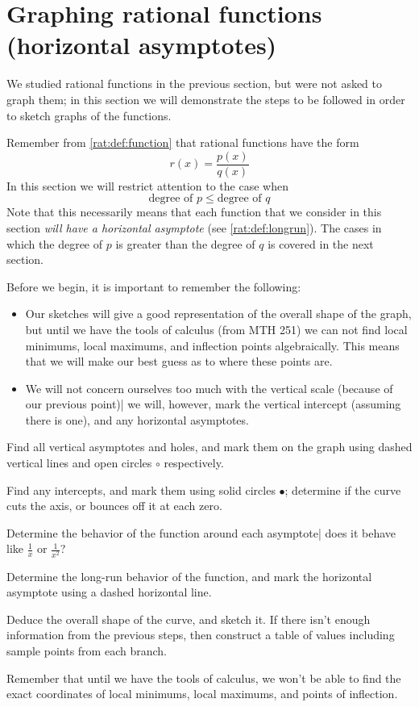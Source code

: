 \section{Graphing rational functions (horizontal asymptotes)}
We studied rational functions in the previous section, but were
not asked to graph them; in this section we will demonstrate the
steps to be followed in order to sketch graphs of the functions.

Remember from \vref{rat:def:function} that rational functions have
the form
\[
	r(x)=\frac{p(x)}{q(x)}
\]
In this section we will restrict attention to the case when
\[
	\text{degree of }p\leq \text{degree of }q
\]
Note that this necessarily means that each function that we consider
in this section \emph{will have a horizontal asymptote} (see \vref{rat:def:longrun}).
The cases in which the degree of $p$ is greater than the degree of $q$
is covered in the next section.

Before we begin, it is important to remember the following:
\begin{itemize}
	\item Our sketches will give a good representation of the overall
	      shape of the graph, but until we have the tools of calculus (from MTH 251)
	      we can not find local minimums, local maximums, and inflection points algebraically. This
	      means that we will make our best guess as to where these points are.
	\item We will not concern ourselves too much with the vertical scale (because of
	      our previous point)| we will, however, mark the vertical intercept (assuming there is one),
	      and any horizontal asymptotes.
\end{itemize}
\begin{pccspecialcomment}\label{rat:def:stepsforsketch}
	\begin{steps}
		\item \label{rat:step:first} Find all vertical asymptotes and holes, and mark them on the
		graph using dashed vertical lines and open circles $\circ$ respectively.
		\item Find any intercepts, and mark them using solid circles $\bullet$;
		determine if the curve cuts the axis, or bounces off it at each zero.
		\item Determine the behavior of the function around each asymptote| does
		it behave like $\frac{1}{x}$ or $\frac{1}{x^2}$?
		\item \label{rat:step:penultimate} Determine the long-run behavior of the function, and mark the horizontal
		asymptote using a dashed horizontal line.
		\item \label{rat:step:last}  Deduce the overall shape of the curve, and sketch it. If there isn't
		enough information from the previous steps, then construct a table of values
		including sample points from each branch.
	\end{steps}
	Remember that until we have the tools of calculus, we won't be able to
	find the exact coordinates of local minimums, local maximums, and points
	of inflection.
\end{pccspecialcomment}


